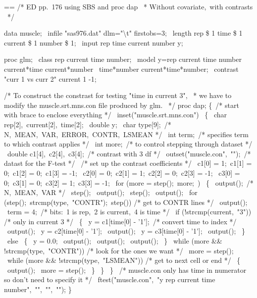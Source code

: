 \documentclass{book}
\makeatletter
\newenvironment{Texinfopreformatted}{%
  \par\GNUTobeylines\obeyspaces\frenchspacing\parskip=\z@\parindent=\z@}{}
{\catcode`\^^M=13 \gdef\GNUTobeylines{\catcode`\^^M=13 \def^^M{\null\par}}}
\newenvironment{Texinfoindented}{\begin{list}{}{}\item\relax}{\end{list}}
\renewcommand{\_}{\Texinfounderscore\discretionary{}{}{}}
\makeatother
\begin{document}
\begin{Texinfoindented}
\begin{Texinfopreformatted}%
\ttfamily 
/* ED pp.\ 176 using SBS and proc dap
\ * Without covariate,\ with contrasts
\ */

data muscle;
\ infile "sas976.dat" dlm="\textbackslash{}t" firstobs=3;
\ length rep \$ 1 time \$ 1 current \$ 1 number \$ 1;
\ input rep time current number y;

proc glm;
\ class rep current time number;
\ model y=rep current time number current*time current*number
\         time*number current*time*number;
\ contrast "curr 1 vs curr 2" current 1 -1;

/* To construct the constrast for testing "time in current 3",
\ * we have to modify the muscle.srt.mns.con file produced by glm.
\ */
proc dap;
\{\ /* start with brace to enclose everything */
\  inset("muscle.srt.mns.con")
\   \{
\     char rep[2],\ current[2],\ time[2];
\     double y;
\     char \_type\_[9];\ /* N,\ MEAN,\ VAR,\ ERROR,\ CONTR,\ LSMEAN */
\     int \_term\_;\ /* specifies term to which contrast applies */
\     int more;\ /* to control stepping through dataset */
\     double c1[4],\ c2[4],\ c3[4];\ /* contrast with 3 df */
\     outset("muscle.con",\ "");\ /* datast for the F-test */
\     /* set up the contrast coefficients */
\     c1[0] = 1;\ c1[1] = 0;\ c1[2] = 0;\ c1[3] = -1;
\     c2[0] = 0;\ c2[1] = 1;\ c2[2] = 0;\ c2[3] = -1;
\     c3[0] = 0;\ c3[1] = 0;\ c3[2] = 1;\ c3[3] = -1;
\     for (more = step();\ more;\ )
\      \{
\        output();\ /* N,\ MEAN,\ VAR */
\        step();
\        output();
\        step();
\        output();
\        for (step();\ strcmp(\_type\_,\ "CONTR");\ step()) /* get to CONTR lines */
\          output();
\        \_term\_ = 4;\ /* bits:\ 1 is rep,\ 2 is current,\ 4 is time */
\        if (!strcmp(current,\ "3")) /* only in current 3 */
\         \{
\           y = c1[time[0] - '1'];\ /* convert time to index */
\           output();
\           y = c2[time[0] - '1'];
\           output();
\           y = c3[time[0] - '1'];
\           output();
\         \}
\        else
\         \{
\           y = 0.0;
\           output();
\           output();
\           output();
\         \}
\        while (more \&\& !strcmp(\_type\_,\ "CONTR")) /* look for the ones we want */
\           more = step();
\        while (more \&\& !strcmp(\_type\_,\ "LSMEAN")) /* get to next cell or end */
\         \{
\           output();
\           more = step();
\         \}
\      \}
\   \}
\  /* muscle.con only has time in numerator so don't need to specify it */
\  ftest("muscle.con",\ "y rep current time number",\ "",\ "",\ "");
\}

\end{Texinfopreformatted}
\end{Texinfoindented}
\end{document}
